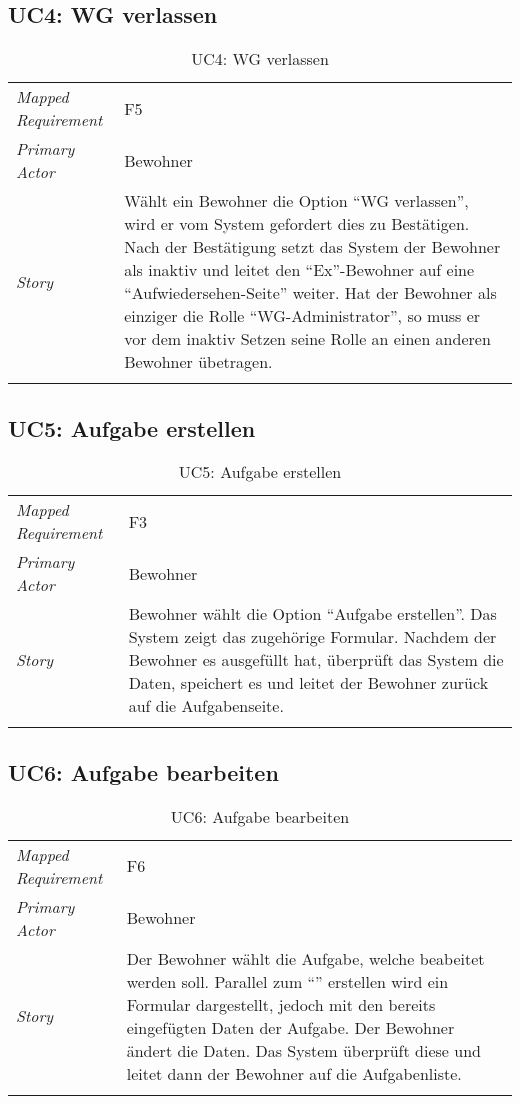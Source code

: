 \subsection{UC4: WG verlassen}\label{subsec:uc4}
\begin{table}[H]
	\tablestyle
	\tablealtcolored
	\begin{tabularx}{\textwidth}{lX}
		\tablebody
			\textit{Mapped Requirement} &
			F5
			\tabularnewline
			\textit{Primary Actor} &
			Bewohner
			\tabularnewline
			\textit{Story} &
			Wählt ein Bewohner die Option ``WG verlassen'', wird er vom System gefordert dies zu Bestätigen. Nach der Bestätigung setzt das System der Bewohner als inaktiv und leitet den ``Ex''-Bewohner auf eine ``Aufwiedersehen-Seite'' weiter. \newline
			Hat der Bewohner als einziger die Rolle ``WG-Administrator'', so muss er vor dem inaktiv Setzen seine Rolle an einen anderen Bewohner übetragen.
			\tabularnewline
		\tableend
	\end{tabularx}
	\caption{UC4: WG verlassen}
\end{table}


\subsection{UC5: Aufgabe erstellen}\label{subsec:uc5}
\begin{table}[H]
	\tablestyle
	\tablealtcolored
	\begin{tabularx}{\textwidth}{lX}
		\tablebody
			\textit{Mapped Requirement} &
			F3
			\tabularnewline
			\textit{Primary Actor} &
			Bewohner
			\tabularnewline
			\textit{Story} &
			Bewohner wählt die Option ``Aufgabe erstellen''. Das System zeigt das zugehörige Formular. Nachdem der Bewohner es ausgefüllt hat, überprüft das System die Daten, speichert es und leitet der Bewohner zurück auf die Aufgabenseite.
			\tabularnewline
		\tableend
	\end{tabularx}
	\caption{UC5: Aufgabe erstellen}
\end{table}


\subsection{UC6: Aufgabe bearbeiten}\label{subsec:uc6}
\begin{table}[H]
	\tablestyle
	\tablealtcolored
	\begin{tabularx}{\textwidth}{lX}
		\tablebody
			\textit{Mapped Requirement} &
			F6
			\tabularnewline
			\textit{Primary Actor} &
			Bewohner
			\tabularnewline
			\textit{Story} &
			Der Bewohner wählt die Aufgabe, welche beabeitet werden soll. Parallel zum ``\nameref{subsec:uc5}'' erstellen wird ein Formular dargestellt, jedoch mit den bereits eingefügten Daten der Aufgabe. Der Bewohner ändert die Daten. Das System überprüft diese und leitet dann der Bewohner auf die Aufgabenliste.
			\tabularnewline
		\tableend
	\end{tabularx}
	\caption{UC6: Aufgabe bearbeiten}
\end{table}


